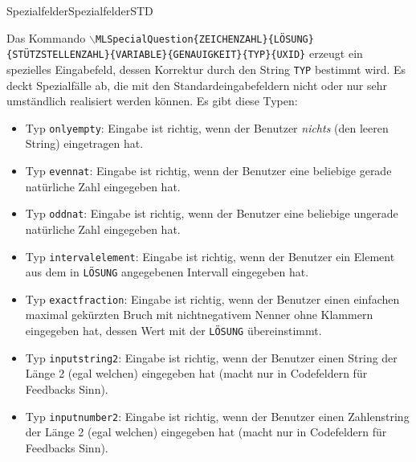 \begin{MXContent}{Spezialfelder}{Spezialfelder}{STD}

\begin{MInfo}
Das Kommando \texttt{$\backslash$MLSpecialQuestion\{ZEICHENZAHL\}\{LÖSUNG\}\{STÜTZSTELLENZAHL\}\{VARIABLE\}\{GENAUIGKEIT\}\{TYP\}\{UXID\}}
erzeugt ein spezielles Eingabefeld, dessen Korrektur durch den String \texttt{TYP} bestimmt wird. Es deckt Spezialfälle ab, die mit den
Standardeingabefeldern nicht oder nur sehr umständlich realisiert werden können. Es gibt diese Typen:
\begin{itemize}
\item{Typ \texttt{onlyempty}: Eingabe ist richtig, wenn der Benutzer \textit{nichts} (den leeren String) eingetragen hat.}
\item{Typ \texttt{evennat}: Eingabe ist richtig, wenn der Benutzer eine beliebige gerade natürliche Zahl eingegeben hat.}
\item{Typ \texttt{oddnat}: Eingabe ist richtig, wenn der Benutzer eine beliebige ungerade natürliche Zahl eingegeben hat.}
\item{Typ \texttt{intervalelement}: Eingabe ist richtig, wenn der Benutzer ein Element aus dem in \texttt{LÖSUNG} angegebenen Intervall eingegeben hat.}
\item{Typ \texttt{exactfraction}: Eingabe ist richtig, wenn der Benutzer einen einfachen maximal gekürzten Bruch mit nichtnegativem Nenner ohne Klammern eingegeben hat, dessen Wert mit der \texttt{LÖSUNG} übereinstimmt.}
\item{Typ \texttt{inputstring2}: Eingabe ist richtig, wenn der Benutzer einen String der Länge 2 (egal welchen) eingegeben hat (macht nur in Codefeldern für Feedbacks Sinn).}
\item{Typ \texttt{inputnumber2}: Eingabe ist richtig, wenn der Benutzer einen Zahlenstring der Länge 2 (egal welchen) eingegeben hat (macht nur in Codefeldern für Feedbacks Sinn).}
\end{itemize}
\end{MInfo}


\end{MXContent}
